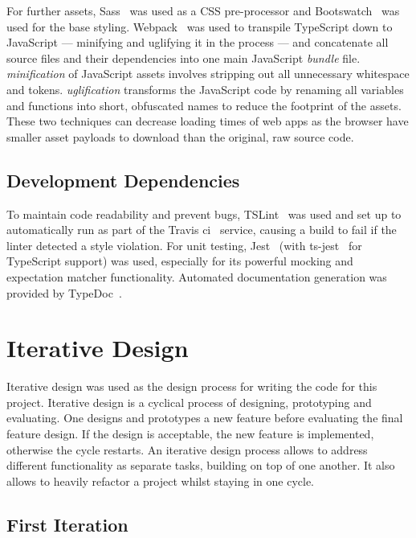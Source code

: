 \documentclass[nobib, a4paper, twoside, justified]{tufte-book}
\begin{document}
For further assets, Sass~\autocite{sass-lang} was used as a CSS pre-processor and
Bootswatch~\autocite{bootswatch-flatly} was used for the base styling.  Webpack~\autocite{webpack}
was used to \gls{transpile} TypeScript down to JavaScript --- minifying and uglifying it in the
process --- and concatenate all source files and their dependencies into one main JavaScript
\textit{bundle} file. \textit{\Gls{minification}} of JavaScript assets involves stripping out all
unnecessary whitespace and tokens. \textit{\Gls{uglification}} transforms the JavaScript code by
renaming all variables and functions into short, obfuscated names to reduce the footprint of the
assets. These two techniques can decrease loading times of web apps as the browser have smaller
asset payloads to download than the original, raw source code.

\subsection{Development Dependencies}%
\label{sub:development_dependencies}

To maintain code readability and prevent bugs, TSLint~\autocite{tslint} was used and set up to
automatically run as part of the Travis \gls{ci}~\autocite{travis} service, causing a build to fail
if the linter detected a style violation. For unit testing, Jest~\autocite{jest} (with
ts-jest~\autocite{ts-jest} for TypeScript support) was used, especially for its powerful mocking
and expectation matcher functionality. Automated documentation generation was provided by
TypeDoc~\autocite{typedoc}.

\section{Iterative Design}%
\label{sec:iterative_design}

Iterative design was used as the design process for writing the code for this project. Iterative
design is a cyclical process of designing, prototyping and evaluating. One designs and prototypes a
new feature before evaluating the final feature design. If the design is acceptable, the new
feature is implemented, otherwise the cycle restarts. An iterative design process allows to address
different functionality as separate tasks, building on top of one another. It also allows to
heavily refactor a project whilst staying in one cycle.

\subsection{First Iteration}%
\label{sub:first_iteration}
\end{document}
